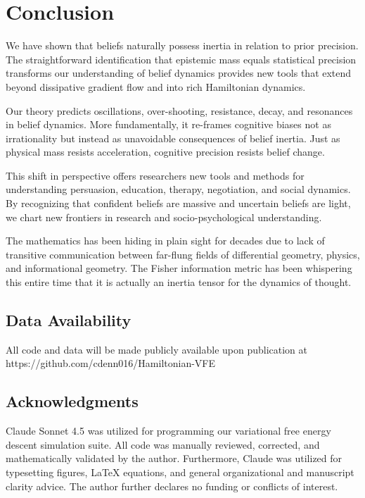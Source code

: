 \documentclass[12pt]{article}
\begin{document}
\section{Conclusion}

We have shown that beliefs naturally possess inertia in relation to prior precision. The straightforward identification that epistemic mass equals statistical precision transforms our understanding of belief dynamics provides new tools that extend beyond dissipative gradient flow and into rich Hamiltonian dynamics.

Our theory predicts oscillations, over-shooting, resistance, decay, and resonances in belief dynamics. More fundamentally, it re-frames cognitive biases not as irrationality but instead as unavoidable consequences of belief inertia. Just as physical mass resists acceleration, cognitive precision resists belief change. 

This shift in perspective offers researchers new tools and methods for understanding persuasion, education, therapy, negotiation, and social dynamics. By recognizing that confident beliefs are massive and uncertain beliefs are light, we chart new frontiers in research and socio-psychological understanding.

The mathematics has been hiding in plain sight for decades due to lack of transitive communication between far-flung fields of differential geometry, physics, and informational geometry.  The Fisher information metric has been whispering this entire time that it is actually an inertia tensor for the dynamics of thought.

\subsection*{Data Availability}
All code and data will be made publicly available upon publication at \\ 
https://github.com/cdenn016/Hamiltonian-VFE

\subsection*{Acknowledgments}
Claude Sonnet 4.5 was utilized for programming our variational free energy descent simulation suite.  All code was manually reviewed, corrected, and mathematically validated by the author.  Furthermore, Claude was utilized for typesetting figures, LaTeX equations, and general organizational and manuscript clarity advice. The author further declares no funding or conflicts of interest.
\end{document}
